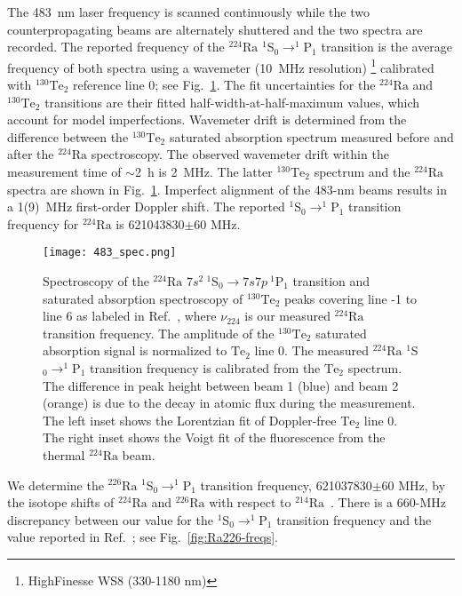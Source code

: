 \documentclass[
 reprint,
 amsmath,amssymb,
 aps,
 prr,
 superscriptaddress,
]{revtex4-2}
\newcommand{\iso}[2]{\ensuremath{^{#2}\mathrm{#1}}}
\begin{document}
The 483~nm laser frequency is scanned continuously while the two counterpropagating beams are alternately shuttered and the two spectra are recorded. The reported frequency of the \iso{Ra}{224} \mbox{$^1$S$_{0} \rightarrow ^1$P$_1$} transition is the average frequency of both spectra using a wavemeter (10~MHz resolution) \footnote{HighFinesse WS8 (330-1180 nm)} calibrated with \iso{Te}{130}$_2$ reference line 0; see Fig.~\ref{fig:483-spec}. The fit uncertainties for the \iso{Ra}{224} and \iso{Te}{130}$_2$ transitions are their fitted half-width-at-half-maximum values, which account for model imperfections. Wavemeter drift is determined from the difference between the \iso{Te}{130}$_2$ saturated absorption spectrum measured before and after the \iso{Ra}{224} spectroscopy. The observed wavemeter drift within the measurement time of $\sim$2~h is 2~MHz. The latter \iso{Te}{130}$_2$ spectrum and the \iso{Ra}{224} spectra are shown in Fig.~\ref{fig:483-spec}. Imperfect alignment of the 483-nm beams results in a 1(9)~MHz first-order Doppler shift. The reported \mbox{$^1$S$_{0} \rightarrow ^1$P$_1$} transition frequency for \iso{Ra}{224} is \SI{621043830}{}$\pm60$ MHz.

\begin{figure}[h]
    \centering
    \texttt{[image: 483\_spec.png]}
    \caption{Spectroscopy of the \iso{Ra}{224} \mbox{$7s^2\ ^1$S$_0 \rightarrow 7s7p\ ^1$P$_1$} transition and saturated absorption spectroscopy of \iso{Te}{130}$_2$ peaks covering line -1 to line 6 as labeled in Ref.~\cite{Santra2014}, where $\nu_{224}$ is our measured \iso{Ra}{224} transition frequency. The amplitude of the \iso{Te}{130}$_2$ saturated absorption signal is normalized to $\mathrm{Te_{2}}$ line 0. The measured $\mathrm{^{224}Ra}$ \mbox{$^1$S$_0 \rightarrow ^1$P$_1$}  transition frequency is calibrated from the $\mathrm{Te_{2}}$ spectrum. The difference in peak height between beam 1 (blue) and beam 2 (orange) is due to the decay in atomic flux during the measurement.
    The left inset shows the Lorentzian fit of Doppler-free $\mathrm{Te_{2}}$ line 0.
    The right inset shows the Voigt fit of the fluorescence from the thermal \iso{Ra}{224} beam.} 
    \label{fig:483-spec}
\end{figure}

We determine the \iso{Ra}{226} \mbox{$^1$S$_{0} \rightarrow ^1$P$_1$} transition frequency, \SI{621037830}{}$\pm60$ MHz, by the isotope shifts of \iso{Ra}{224} and \iso{Ra}{226} with respect to \iso{Ra}{214}~\cite{Wendt1987}. There is a 660-MHz discrepancy between our value for the \mbox{$^1$S$_{0} \rightarrow ^1$P$_1$} transition frequency and the value reported in Ref.~\cite{Dammalapati2016}; see Fig.~\ref{fig:Ra226-freqs}.
\end{document}
